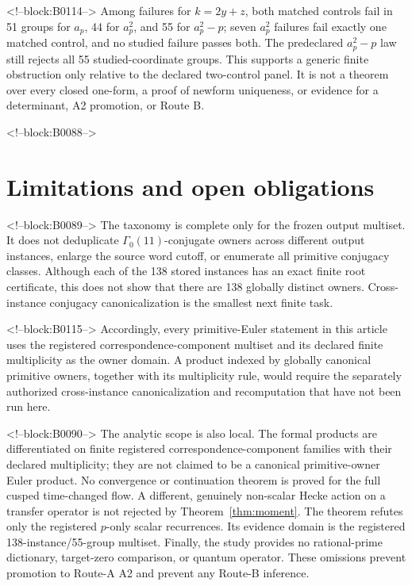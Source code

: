 \documentclass[11pt]{article}
\theoremstyle{definition}
\theoremstyle{remark}
\newcommand{\G}{\Gamma_0(11)}
\begin{document}
<!--block:B0114-->
Among failures for $k=2y+z$, both matched controls fail in 51 groups for $a_p$, 44 for $a_p^2$, and 55 for $a_p^2-p$; seven $a_p^2$ failures fail exactly one matched control, and no studied failure passes both. The predeclared $a_p^2-p$ law still rejects all 55 studied-coordinate groups. This supports a generic finite obstruction only relative to the declared two-control panel. It is not a theorem over every closed one-form, a proof of newform uniqueness, or evidence for a determinant, A2 promotion, or Route B.

<!--block:B0088-->
\section{Limitations and open obligations}

<!--block:B0089-->
The taxonomy is complete only for the frozen output multiset. It does not deduplicate $\G$-conjugate owners across different output instances, enlarge the source word cutoff, or enumerate all primitive conjugacy classes. Although each of the 138 stored instances has an exact finite root certificate, this does not show that there are 138 globally distinct owners. Cross-instance conjugacy canonicalization is the smallest next finite task.

<!--block:B0115-->
Accordingly, every primitive-Euler statement in this article uses the registered correspondence-component multiset and its declared finite multiplicity as the owner domain. A product indexed by globally canonical primitive owners, together with its multiplicity rule, would require the separately authorized cross-instance canonicalization and recomputation that have not been run here.

<!--block:B0090-->
The analytic scope is also local. The formal products are differentiated on finite registered correspondence-component families with their declared multiplicity; they are not claimed to be a canonical primitive-owner Euler product. No convergence or continuation theorem is proved for the full cusped time-changed flow. A different, genuinely non-scalar Hecke action on a transfer operator is not rejected by Theorem~\ref{thm:moment}. The theorem refutes only the registered $p$-only scalar recurrences. Its evidence domain is the registered 138-instance/55-group multiset. Finally, the study provides no rational-prime dictionary, target-zero comparison, or quantum operator. These omissions prevent promotion to Route-A A2 and prevent any Route-B inference.
\end{document}
